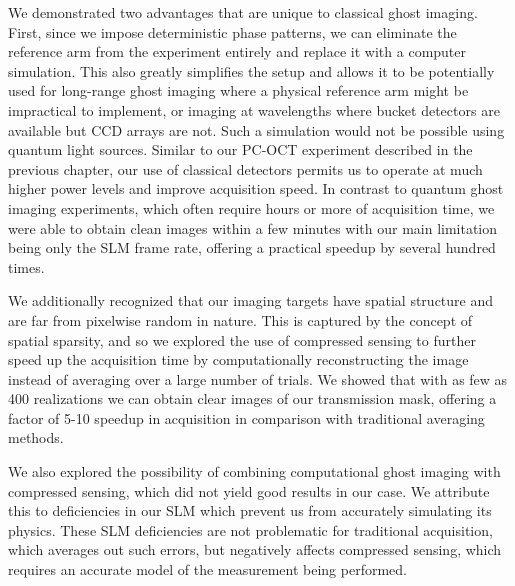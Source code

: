 We demonstrated two advantages that are unique to classical ghost imaging. First, since we impose deterministic phase patterns, we can eliminate the reference arm from the experiment entirely and replace it with a computer simulation. This also greatly simplifies the setup and allows it to be potentially used for long-range ghost imaging where a physical reference arm might be impractical to implement, or imaging at wavelengths where bucket detectors are available but CCD arrays are not. Such a simulation would not be possible using quantum light sources. Similar to our PC-OCT experiment described in the previous chapter, our use of classical detectors permits us to operate at much higher power levels and improve acquisition speed. In contrast to quantum ghost imaging experiments, which often require hours or more of acquisition time, we were able to obtain clean images within a few minutes with our main limitation being only the SLM frame rate, offering a practical speedup by several hundred times.

We additionally recognized that our imaging targets have spatial structure and are far from pixelwise random in nature. This is captured by the concept of spatial sparsity, and so we explored the use of compressed sensing to further speed up the acquisition time by computationally reconstructing the image instead of averaging over a large number of trials. We showed that with as few as 400 realizations we can obtain clear images of our transmission mask, offering a factor of 5-10 speedup in acquisition in comparison with traditional averaging methods.

We also explored the possibility of combining computational ghost imaging with compressed sensing, which did not yield good results in our case. We attribute this to deficiencies in our SLM which prevent us from accurately simulating its physics. These SLM deficiencies are not problematic for traditional acquisition, which averages out such errors, but negatively affects compressed sensing, which requires an accurate model of the measurement being performed. 
